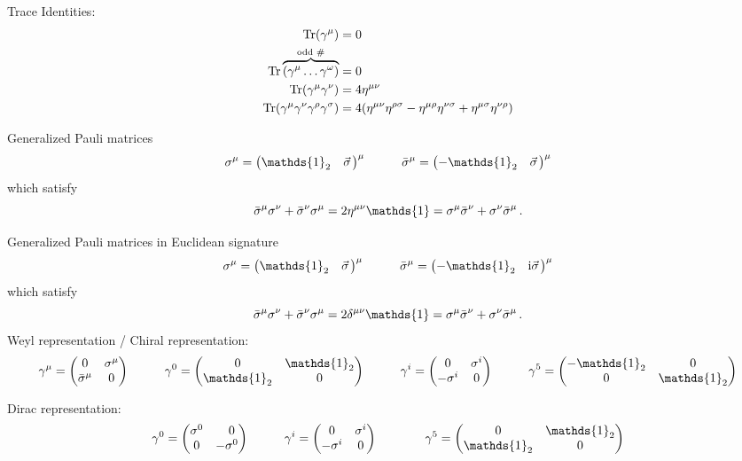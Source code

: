 			\noindent
			Trace Identities:
			\begin{align}
				\Tr(\gamma^\mu) &= 0 \\
				\Tr\overbrace{({\gamma^\mu\dots\gamma^\omega})}^{\text{odd \#}} &= 0 \\
				\Tr(\gamma^\mu \gamma^\nu) &= 4 \eta^{\mu\nu} \\
				\Tr(\gamma^\mu \gamma^\nu \gamma^\rho \gamma^\sigma) &= 4\qty(\eta^{\mu\nu}\eta^{\rho\sigma} - \eta^{\mu\rho}\eta^{\nu\sigma} + \eta^{\mu\sigma}\eta^{\nu\rho})
			\end{align}

			\noindent
			Generalized Pauli matrices
			\begin{equation}
				\sigma^\mu = \mqty(\mathds{1}_2 & \vec{\sigma})^\mu
				\hsp \barsigma^\mu = \mqty(-\mathds{1}_2 & \vec{\sigma})^\mu
			\end{equation}
			which satisfy
			\begin{equation}
				\barsigma^\mu \sigma^\nu + \barsigma^\nu \sigma^\mu = 2\eta^{\mu\nu}\mathds{1}= \sigma^\mu \barsigma^\nu + \sigma^\nu \barsigma^\mu\,.
			\end{equation}

			\noindent
			Generalized Pauli matrices in Euclidean signature
			\begin{equation}
				\sigma^\mu = \mqty(\mathds{1}_2 & \vec{\sigma})^\mu
				\hsp \barsigma^\mu = \mqty(-\mathds{1}_2 & \i\vec{\sigma})^\mu
			\end{equation}
			which satisfy
			\begin{equation}
				\barsigma^\mu \sigma^\nu + \barsigma^\nu \sigma^\mu = 2\delta^{\mu\nu}\mathds{1}= \sigma^\mu \barsigma^\nu + \sigma^\nu \barsigma^\mu\,.
			\end{equation}
			\noindent
			Weyl representation / Chiral representation:
			\begin{equation}
				\gamma^\mu = \mqty(
				0 & \sigma^\mu \\
				\barsigma^\mu & 0
				)
				\hsp
				\gamma^0 = \mqty(
				0 & \mathds{1}_2 \\
				\mathds{1}_2 & 0
				)
				\hsp
				\gamma^i = \mqty(
				0 & \sigma^i \\
				-\sigma^i & 0
				)
				\hsp
				\gamma^5 = \mqty(
				-\mathds{1}_2 & 0 \\
				0 & \mathds{1}_2
				)
			\end{equation}

			\noindent
			Dirac representation:
			\begin{equation}
				\begin{aligned}
					\gamma^0
					= \left( \begin{matrix}
							\sigma^0 & \M0       \\
							0        & -\sigma^0
						\end{matrix} \right)
					&\hsp
					\gamma^i = \mqty(
					0 & \sigma^i \\
					-\sigma^i & 0
					)
					&\hsp
					\gamma^5 = \mqty(
					0 & \mathds{1}_2 \\
					\mathds{1}_2 & 0
					)
				\end{aligned}
			\end{equation}

